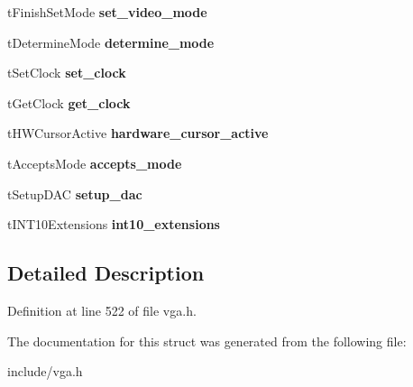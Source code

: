 \begin{DoxyCompactItemize}
\item 
\hypertarget{structSVGA__Driver_afad168056782b84b2eec03c3e0b6f132}{t\-Finish\-Set\-Mode {\bfseries set\-\_\-video\-\_\-mode}}\label{structSVGA__Driver_afad168056782b84b2eec03c3e0b6f132}

\item 
\hypertarget{structSVGA__Driver_a2d72eb682afc752821c0f1ec4e3d0ce3}{t\-Determine\-Mode {\bfseries determine\-\_\-mode}}\label{structSVGA__Driver_a2d72eb682afc752821c0f1ec4e3d0ce3}

\item 
\hypertarget{structSVGA__Driver_a59225904a80dbe9f92d9ba2ee227e1f8}{t\-Set\-Clock {\bfseries set\-\_\-clock}}\label{structSVGA__Driver_a59225904a80dbe9f92d9ba2ee227e1f8}

\item 
\hypertarget{structSVGA__Driver_a209ef280bb27f00d2226050998cd5cb0}{t\-Get\-Clock {\bfseries get\-\_\-clock}}\label{structSVGA__Driver_a209ef280bb27f00d2226050998cd5cb0}

\item 
\hypertarget{structSVGA__Driver_a3936aa6067ba314fe1aa38fbc89933cd}{t\-H\-W\-Cursor\-Active {\bfseries hardware\-\_\-cursor\-\_\-active}}\label{structSVGA__Driver_a3936aa6067ba314fe1aa38fbc89933cd}

\item 
\hypertarget{structSVGA__Driver_a80ae597edcf43eeb150550b23752729c}{t\-Accepts\-Mode {\bfseries accepts\-\_\-mode}}\label{structSVGA__Driver_a80ae597edcf43eeb150550b23752729c}

\item 
\hypertarget{structSVGA__Driver_a5968c7cd8b28c97aea5860fbe6433e02}{t\-Setup\-D\-A\-C {\bfseries setup\-\_\-dac}}\label{structSVGA__Driver_a5968c7cd8b28c97aea5860fbe6433e02}

\item 
\hypertarget{structSVGA__Driver_aff7ace887c47e1f700375eb6324b1d91}{t\-I\-N\-T10\-Extensions {\bfseries int10\-\_\-extensions}}\label{structSVGA__Driver_aff7ace887c47e1f700375eb6324b1d91}

\end{DoxyCompactItemize}


\subsection{Detailed Description}


Definition at line 522 of file vga.\-h.



The documentation for this struct was generated from the following file\-:\begin{DoxyCompactItemize}
\item 
include/vga.\-h\end{DoxyCompactItemize}
